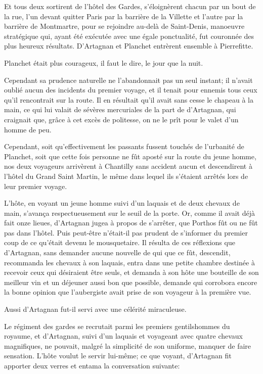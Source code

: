 Et tous deux sortirent de l'hôtel des Gardes, s'éloignèrent chacun par un bout de la rue, l'un devant quitter Paris par la barrière de la Villette et l'autre par la barrière de Montmartre, pour se rejoindre au-delà de Saint-Denis, manoeuvre stratégique qui, ayant été exécutée avec une égale ponctualité, fut couronnée des plus heureux résultats. D'Artagnan et Planchet entrèrent ensemble à Pierrefitte. 

Planchet était plus courageux, il faut le dire, le jour que la nuit. 

Cependant sa prudence naturelle ne l'abandonnait pas un seul instant; il n'avait oublié aucun des incidents du premier voyage, et il tenait pour ennemis tous ceux qu'il rencontrait sur la route. Il en résultait qu'il avait sans cesse le chapeau à la main, ce qui lui valait de sévères mercuriales de la part de d'Artagnan, qui craignait que, grâce à cet excès de politesse, on ne le prît pour le valet d'un homme de peu. 

Cependant, soit qu'effectivement les passants fussent touchés de l'urbanité de Planchet, soit que cette fois personne ne fût aposté sur la route du jeune homme, nos deux voyageurs arrivèrent à Chantilly sans accident aucun et descendirent à l'hôtel du Grand Saint Martin, le même dans lequel ils s'étaient arrêtés lors de leur premier voyage. 

L'hôte, en voyant un jeune homme suivi d'un laquais et de deux chevaux de main, s'avança respectueusement sur le seuil de la porte. Or, comme il avait déjà fait onze lieues, d'Artagnan jugea à propos de s'arrêter, que Porthos fût ou ne fût pas dans l'hôtel. Puis peut-être n'était-il pas prudent de s'informer du premier coup de ce qu'était devenu le mousquetaire. Il résulta de ces réflexions que d'Artagnan, sans demander aucune nouvelle de qui que ce fût, descendit, recommanda les chevaux à son laquais, entra dans une petite chambre destinée à recevoir ceux qui désiraient être seuls, et demanda à son hôte une bouteille de son meilleur vin et un déjeuner aussi bon que possible, demande qui corrobora encore la bonne opinion que l'aubergiste avait prise de son voyageur à la première vue. 

Aussi d'Artagnan fut-il servi avec une célérité miraculeuse. 

Le régiment des gardes se recrutait parmi les premiers gentilshommes du royaume, et d'Artagnan, suivi d'un laquais et voyageant avec quatre chevaux magnifiques, ne pouvait, malgré la simplicité de son uniforme, manquer de faire sensation. L'hôte voulut le servir lui-même; ce que voyant, d'Artagnan fit apporter deux verres et entama la conversation suivante: 

